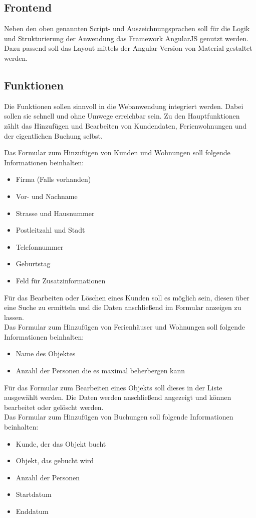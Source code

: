 \subsection{Frontend}
Neben den oben genannten Script- und Auszeichnungsprachen soll für die Logik und Strukturierung der Anwendung das Framework AngularJS genutzt werden. Dazu passend soll das Layout mittels der Angular Version von Material gestaltet werden. 

\subsection{Funktionen}
Die Funktionen sollen sinnvoll in die Webanwendung integriert werden. Dabei sollen sie schnell und ohne Umwege erreichbar sein. Zu den Hauptfunktionen zählt das Hinzufügen und Bearbeiten von Kundendaten, Ferienwohnungen und der eigentlichen Buchung selbst. 

Das Formular zum Hinzufügen von Kunden und Wohnungen soll folgende Informationen beinhalten:
\begin{itemize} 
\item Firma (Falls vorhanden)
\item Vor- und Nachname
\item Strasse und Hausnummer
\item Postleitzahl und Stadt
\item Telefonnummer
\item Geburtstag 
\item Feld für Zusatzinformationen
\end{itemize}
Für das Bearbeiten oder Löschen eines Kunden soll es möglich sein, diesen über eine Suche zu ermitteln und die Daten anschließend im Formular anzeigen zu lassen.
\\

Das Formular zum Hinzufügen von Ferienhäuser und Wohnungen soll folgende Informationen beinhalten:
\begin{itemize} 
\item Name des Objektes
\item Anzahl der Personen die es maximal beherbergen kann
\end{itemize}
Für das Formular zum Bearbeiten eines Objekts soll dieses in der Liste ausgewählt werden. Die Daten werden anschließend angezeigt und können bearbeitet oder gelöscht werden.  
\\

Das Formular zum Hinzufügen von Buchungen soll folgende Informationen beinhalten:
\begin{itemize} 
\item Kunde, der das Objekt bucht
\item Objekt, das gebucht wird
\item Anzahl der Personen
\item Startdatum
\item Enddatum
\end{itemize}

